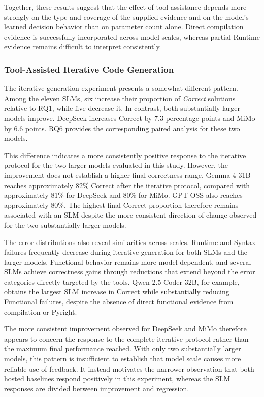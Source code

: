 Together, these results suggest that the effect of tool assistance depends more strongly on the type and coverage of the supplied evidence and on the model's learned decision behavior than on parameter count alone. Direct compilation evidence is successfully incorporated across model scales, whereas partial Runtime evidence remains difficult to interpret consistently.

\subsubsection{Tool-Assisted Iterative Code Generation}

The iterative generation experiment presents a somewhat different pattern. Among the eleven SLMs, six increase their proportion of \emph{Correct} solutions relative to RQ1, while five decrease it. In contrast, both substantially larger models improve. DeepSeek increases Correct by 7.3 percentage points and MiMo by 6.6 points. RQ6 provides the corresponding paired analysis for these two models.

This difference indicates a more consistently positive response to the iterative protocol for the two larger models evaluated in this study. However, the improvement does not establish a higher final correctness range. Gemma 4 31B reaches approximately 82\% Correct after the iterative protocol, compared with approximately 81\% for DeepSeek and 80\% for MiMo. GPT-OSS also reaches approximately 80\%. The highest final Correct proportion therefore remains associated with an SLM despite the more consistent direction of change observed for the two substantially larger models.

The error distributions also reveal similarities across scales. Runtime and Syntax failures frequently decrease during iterative generation for both SLMs and the larger models. Functional behavior remains more model-dependent, and several SLMs achieve correctness gains through reductions that extend beyond the error categories directly targeted by the tools. Qwen 2.5 Coder 32B, for example, obtains the largest SLM increase in Correct while substantially reducing Functional failures, despite the absence of direct functional evidence from compilation or Pyright.

The more consistent improvement observed for DeepSeek and MiMo therefore appears to concern the response to the complete iterative protocol rather than the maximum final performance reached. With only two substantially larger models, this pattern is insufficient to establish that model scale causes more reliable use of feedback. It instead motivates the narrower observation that both hosted baselines respond positively in this experiment, whereas the SLM responses are divided between improvement and regression.

